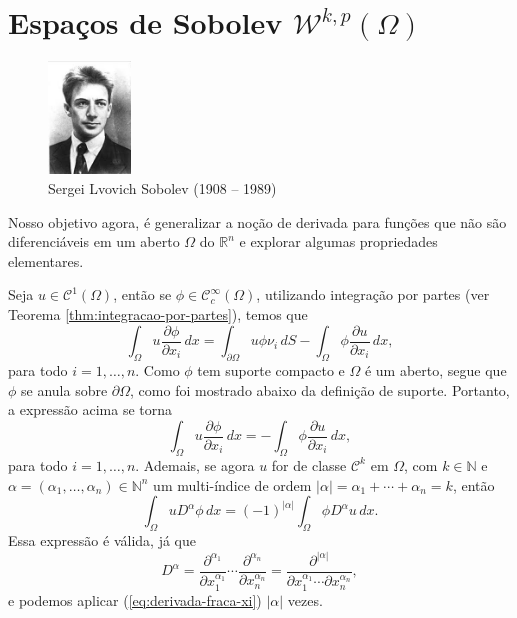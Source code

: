 \documentclass[a4paper, 11pt]{book}
\theoremstyle{definition}
\newcommand{\bN}{\mathbb{N}}
\newcommand{\bR}{\mathbb{R}}
\newcommand{\cC}{\mathcal{C}}
\newcommand{\cW}{\mathcal{W}}
\begin{document}
\section{Espaços de Sobolev $\cW^{k,p}(\Omega)$}

\begin{figure}
    \centering
    \includegraphics[height=3cm]{sobolev.jpg}
    \caption{Sergei Lvovich Sobolev (1908 -- 1989)}
\end{figure}

Nosso objetivo agora, é generalizar a noção de derivada para funções que não são diferenciáveis em um aberto $\Omega$ do $\bR^n$ e explorar algumas propriedades elementares.

Seja $u \in \cC^1(\Omega)$, então se $\phi \in \cC^\infty_c(\Omega)$, utilizando integração por partes (ver Teorema \ref{thm:integracao-por-partes}), temos que
\[
    \int_\Omega u \dfrac{\partial \phi}{\partial x_i} \,dx = \int_{\partial\Omega} u\phi \nu_i \, dS- \int_\Omega \phi \dfrac{\partial u}{\partial x_i} \,dx,
\]
para todo $i = 1,\dots,n$. Como $\phi$ tem suporte compacto e $\Omega$ é um aberto, segue que $\phi$ se anula sobre $\partial\Omega$, como foi mostrado abaixo da definição de suporte. Portanto, a expressão acima se torna
\begin{equation} \label{eq:derivada-fraca-xi}
    \int_\Omega u \dfrac{\partial \phi}{\partial x_i} \,dx = - \int_\Omega \phi \dfrac{\partial u}{\partial x_i} \,dx,
\end{equation}
para todo $i = 1,\dots,n$.
Ademais, se agora $u$ for de classe $\cC^k$ em $\Omega$, com $k \in \bN$ e $\alpha = (\alpha_1,\dots,\alpha_n) \in \bN^n$ um multi-índice de ordem $|\alpha| = \alpha_1 + \cdots + \alpha_n = k$, então
\begin{equation} \label{eq:derivada-fraca-dalpha}
    \int_\Omega u D^\alpha \phi \,dx = (-1)^{|\alpha|} \int_\Omega \phi D^\alpha u \,dx.
\end{equation}
Essa expressão é válida, já que
\[
    D^\alpha = \dfrac{\partial^{\alpha_1} }{\partial x_1^{\alpha_1}} \cdots \dfrac{\partial^{\alpha_n} }{\partial x_n^{\alpha_n}} = \dfrac{\partial^{|\alpha|} }{\partial x_1^{\alpha_1} \cdots \partial x_n^{\alpha_n}},
\]
e podemos aplicar (\ref{eq:derivada-fraca-xi}) $|\alpha|$ vezes.
\end{document}
